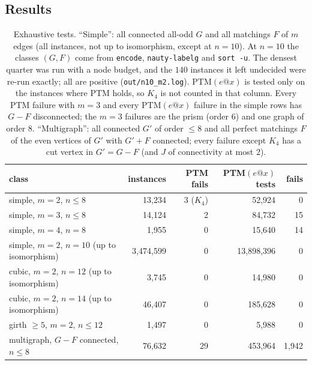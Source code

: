 \documentclass[11pt]{amsart}
\theoremstyle{definition}
\begin{document}
\subsection*{Results}
\begin{table}[!ht]
\centering\footnotesize
\begin{tabular}{@{}lrrrr@{}}
\toprule
class & instances & PTM fails & PTM$(e@x)$ tests & fails\\
\midrule
simple, $m=2$, $n\le8$ & 13{,}234 & 3 ($K_4$) & 52{,}924 & 0\\
simple, $m=3$, $n\le8$ & 14{,}124 & 2 & 84{,}732 & 15 \\
simple, $m=4$, $n=8$ & 1{,}955 & 0 & 15{,}640 & 14 \\
simple, $m=2$, $n=10$ (up to isomorphism) & 3{,}474{,}599 & 0 & 13{,}898{,}396 & 0\\
cubic, $m=2$, $n=12$ (up to isomorphism) & 3{,}745 & 0 & 14{,}980 & 0\\
cubic, $m=2$, $n=14$ (up to isomorphism) & 46{,}407 & 0 & 185{,}628 & 0\\
girth $\ge5$, $m=2$, $n\le12$ & 1{,}497 & 0 & 5{,}988 & 0\\
multigraph, $G-F$ connected, $n\le8$ & 76{,}632 & 29 & 453{,}964 & 1{,}942\\
\bottomrule
\end{tabular}
\caption{Exhaustive tests. ``Simple'': all connected all-odd $G$ and all matchings $F$ of $m$
edges (all instances, not up to isomorphism, except at $n=10$). At $n=10$ the classes $(G,F)$
come from \texttt{encode}, \texttt{nauty-labelg} and \texttt{sort -u}. The densest quarter was
run with a node budget, and the $140$ instances it left undecided were re-run exactly; all are
positive (\texttt{out/n10\_m2.log}). PTM$(e@x)$ is tested only on
the instances where PTM holds, so $K_4$ is not counted in that column. Every PTM failure with
$m=3$ and every PTM$(e@x)$ failure in the simple rows has $G-F$ disconnected; the $m=3$ failures are the
prism (order $6$) and one graph of order $8$. ``Multigraph'': all connected $G'$ of order $\le8$
and all perfect matchings $F$ of the even vertices of $G'$ with $G'+F$ connected; every failure
except $K_4$ has a cut vertex in $G'=G-F$ (and $J$ of connectivity at most $2$).}
\label{tab:exh}
\end{table}
\end{document}
